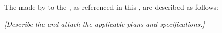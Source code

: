 \noindent The \premisesImprovements made by \lessor to the \premises, as referenced in this \lease, are described as follows:

\bigskip
\noindent \emph{[Describe the \premisesImprovements and attach the applicable plans and specifications.]}
